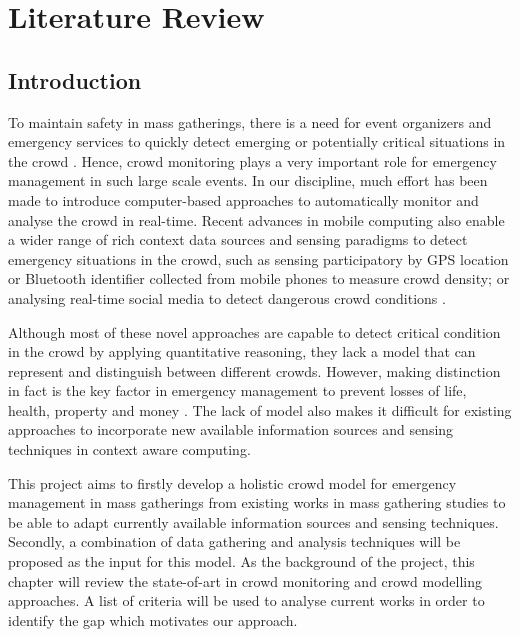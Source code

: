 \chapter{Literature Review}

\ifpdf
    \graphicspath{{Chapter2/Figs/Raster/}{Chapter2/Figs/PDF/}{Chapter2/Figs/}}
\else
    \graphicspath{{Chapter2/Figs/Vector/}{Chapter2/Figs/}}
\fi

\section{Introduction}

To maintain safety in mass gatherings, there is a need for event organizers and emergency services to quickly detect emerging or potentially critical situations in the crowd \citep{Wirz2012} . Hence, crowd monitoring plays a very important role for emergency management in such large scale events. In our discipline, much effort has been made to introduce computer-based approaches to automatically monitor and analyse the crowd in real-time. Recent advances in mobile computing also enable a wider range of rich context data sources and sensing paradigms to detect emergency situations in the crowd, such as sensing participatory by GPS location \citep{Wirz2012} or Bluetooth identifier \citep{Weppner2013} collected from mobile phones to measure crowd density; or analysing real-time social media to detect dangerous crowd conditions \citep{DelirHaghighi2013}.

Although most of these novel approaches are capable to detect critical condition in the crowd by applying quantitative reasoning, they lack a model that can represent and distinguish between different crowds. However, making distinction in fact is the key factor in emergency management to prevent losses of life, health, property and money \citep{Berlonghi1995}. The lack of model also makes it difficult for existing approaches to incorporate new available information sources and sensing techniques in context aware computing.

This project aims to firstly develop a holistic crowd model for emergency management in mass gatherings from existing works in mass gathering studies to be able to adapt currently available information sources and sensing techniques. Secondly, a combination of data gathering and analysis techniques will be proposed as the input for this model.
As the background of the project, this chapter will review the state-of-art in crowd monitoring and crowd modelling approaches. A list of criteria will be used to analyse current works in order to identify the gap which motivates our approach.


